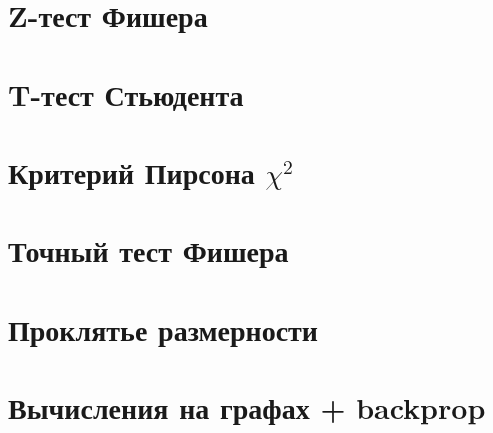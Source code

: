\section{Z-тест Фишера}


\section{T-тест Стьюдента}


\section{Критерий Пирсона $\chi^2$}


\section{Точный тест Фишера}


\section{Проклятье размерности}


\section{Вычисления на графах + backprop}


